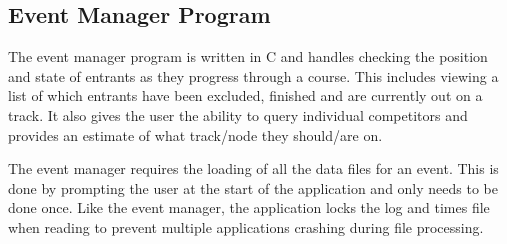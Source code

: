 \documentclass{article}
\begin{document}
\subsection{Event Manager Program}
The event manager program is written in C and handles checking the position and state of entrants as they progress through a course. This includes viewing a list of which entrants have been excluded, finished and are currently out on a track. It also gives the user the ability to query individual competitors and provides an estimate of what track/node they should/are on.

The event manager requires the loading of all the data files for an event. This is done by prompting the user at the start of the application and only needs to be done once. Like the event manager, the application locks the log and times file when reading to prevent multiple applications crashing during file processing.
\end{document}
